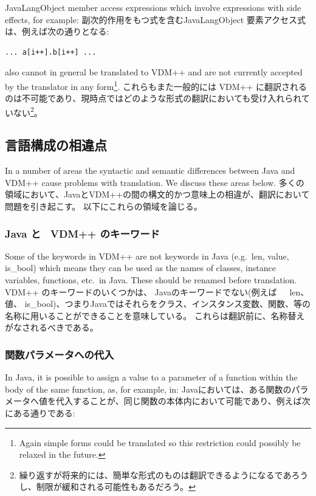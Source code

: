 \documentclass[\pformat,12pt]{jarticle}
\begin{document}
JavaLangObject member access expressions which involve expressions with side
effects, for example:
副次的作用をもつ式を含むJavaLangObject 要素アクセス式は、例えば次の通りとなる:

\begin{small}
\begin{verbatim}
... a[i++].b[i++] ...
\end{verbatim}
\end{small}

also cannot in general be translated to VDM++ and are not currently
accepted by the translator in any form\footnote{Again simple forms
  could be translated so this restriction could possibly be relaxed in
  the future.}.
これらもまた一般的には VDM++ に翻訳されるのは不可能であり、現時点ではどのような形式の翻訳においても受け入れられていない\footnote{繰り返すが将来的には、簡単な形式のものは翻訳できるようになるであろうし、制限が緩和される可能性もあるだろう。}。

\subsection{言語構成の相違点}

In a number of areas the syntactic and semantic differences
between Java and VDM++ cause problems with translation. We discuss
these areas below.
多くの領域において、JavaとVDM++の間の構文的かつ意味上の相違が、翻訳において問題を引き起こす。
以下にこれらの領域を論じる。

\subsubsection{Java と \ VDM++ のキーワード}

Some of the keywords in VDM++ are not keywords in Java (e.g.\ len,
value, is\_bool) which means they can be used as the names of classes,
instance variables, functions, etc.\ in Java. These should be renamed
before translation.
VDM++ のキーワードのいくつかは、 Javaのキーワードでない(例えば　\ len、値、 is\_bool)、つまりJavaではそれらをクラス、インスタンス変数、関数、等の名称に用いることができることを意味している。 
これらは翻訳前に、名称替えがなされるべきである。

\subsubsection{関数パラメータへの代入}

In Java, it is possible to assign a value to a parameter of a function
within the body of the same function, as, for example, in:
Javaにおいては、ある関数のパラメータへ値を代入することが、同じ関数の本体内において可能であり、例えば次にある通りである:
\end{document}
